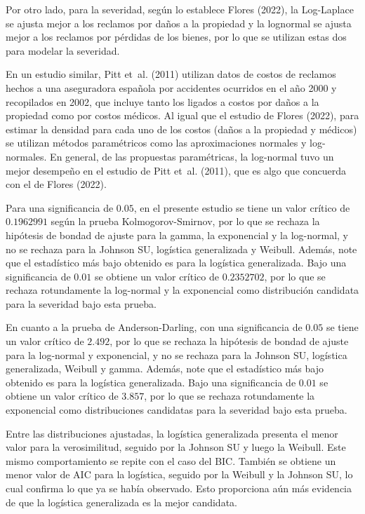 \documentclass[
  letterpaper,
  onepage,
  openany]{scrreprt}
\begin{document}
Por otro lado, para la severidad, según lo establece Flores (2022), la
Log-Laplace se ajusta mejor a los reclamos por daños a la propiedad y la
lognormal se ajusta mejor a los reclamos por pérdidas de los bienes, por
lo que se utilizan estas dos para modelar la severidad.

En un estudio similar, Pitt et~al. (2011) utilizan datos de costos de
reclamos hechos a una aseguradora española por accidentes ocurridos en
el año 2000 y recopilados en 2002, que incluye tanto los ligados a
costos por daños a la propiedad como por costos médicos. Al igual que el
estudio de Flores (2022), para estimar la densidad para cada uno de los
costos (daños a la propiedad y médicos) se utilizan métodos paramétricos
como las aproximaciones normales y log-normales. En general, de las
propuestas paramétricas, la log-normal tuvo un mejor desempeño en el
estudio de Pitt et~al. (2011), que es algo que concuerda con el de
Flores (2022).

Para una significancia de \(0.05\), en el presente estudio se tiene un
valor crítico de \(0.1962991\) según la prueba Kolmogorov-Smirnov, por
lo que se rechaza la hipótesis de bondad de ajuste para la gamma, la
exponencial y la log-normal, y no se rechaza para la Johnson SU,
logística generalizada y Weibull. Además, note que el estadístico más
bajo obtenido es para la logística generalizada. Bajo una significancia
de \(0.01\) se obtiene un valor crítico de \(0.2352702\), por lo que se
rechaza rotundamente la log-normal y la exponencial como distribución
candidata para la severidad bajo esta prueba.

En cuanto a la prueba de Anderson-Darling, con una significancia de
\(0.05\) se tiene un valor crítico de \(2.492\), por lo que se rechaza
la hipótesis de bondad de ajuste para la log-normal y exponencial, y no
se rechaza para la Johnson SU, logística generalizada, Weibull y gamma.
Además, note que el estadístico más bajo obtenido es para la logística
generalizada. Bajo una significancia de \(0.01\) se obtiene un valor
crítico de \(3.857\), por lo que se rechaza rotundamente la exponencial
como distribuciones candidatas para la severidad bajo esta prueba.

Entre las distribuciones ajustadas, la logística generalizada presenta
el menor valor para la verosimilitud, seguido por la Johnson SU y luego
la Weibull. Este mismo comportamiento se repite con el caso del BIC.
También se obtiene un menor valor de AIC para la logística, seguido por
la Weibull y la Johnson SU, lo cual confirma lo que ya se había
observado. Esto proporciona aún más evidencia de que la logística
generalizada es la mejor candidata.
\end{document}
